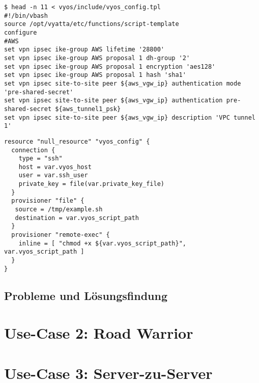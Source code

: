 \begin{lstlisting}[label=tf-generate-tpl,caption=Verschiede set-Kommandos werden in ein VyOS-Skript eingebettet (Interpreter: /bin/vbash). Die Variablen in Zeilen 9-12 resultieren aus dem Funktionsaufruf (s.o.).]
$ head -n 11 < vyos/include/vyos_config.tpl
#!/bin/vbash
source /opt/vyatta/etc/functions/script-template
configure
#AWS
set vpn ipsec ike-group AWS lifetime '28800'
set vpn ipsec ike-group AWS proposal 1 dh-group '2'
set vpn ipsec ike-group AWS proposal 1 encryption 'aes128'
set vpn ipsec ike-group AWS proposal 1 hash 'sha1'
set vpn ipsec site-to-site peer ${aws_vgw_ip} authentication mode 'pre-shared-secret'
set vpn ipsec site-to-site peer ${aws_vgw_ip} authentication pre-shared-secret ${aws_tunnel1_psk}
set vpn ipsec site-to-site peer ${aws_vgw_ip} description 'VPC tunnel 1'
\end{lstlisting}

\begin{lstlisting}[label=tf-generate-psk,caption=Das so generierte Shell-Skript wird per SSH auf das Zielsystem (VyOS-Router) hochgeladen und per provisioner remote-exec ausgeführt.]
resource "null_resource" "vyos_config" {
  connection {
    type = "ssh"
    host = var.vyos_host
    user = var.ssh_user
    private_key = file(var.private_key_file)
  }
  provisioner "file" {
   source = /tmp/example.sh
   destination = var.vyos_script_path
  }
  provisioner "remote-exec" {
    inline = [ "chmod +x ${var.vyos_script_path}", var.vyos_script_path ]
  }
}
\end{lstlisting}



\subsection{Probleme und Lösungsfindung}

\section{Use-Case 2: Road Warrior} \label{Use-Case 2: Road Warrior}

\section{Use-Case 3: Server-zu-Server} \label{Use-Case 3: Server-zu-Server}

